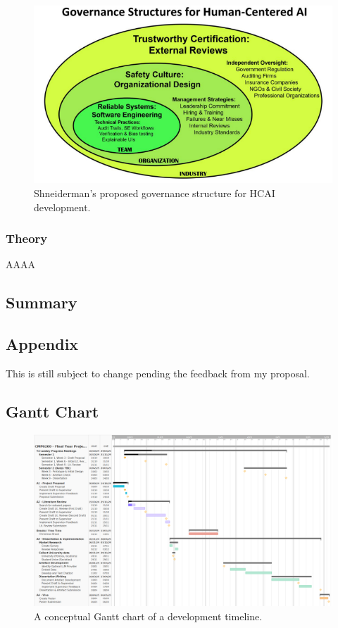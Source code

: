 \documentclass[12pt]{report}
\begin{document}
    
    \begin{figure}[H]
        \centering
        \includegraphics[width=.6\linewidth]{shneidermanStructure.png}
        \caption{Shneiderman's proposed governance structure for HCAI development.}
        \label{fig:govStructure}
    \end{figure}

    \subsection{Theory}

    AAAA
    
    \section{Summary}

    
    \begin{landscape}

    \chapter{Appendix}
    
    \begin{tcolorbox}[colback=red!5!white,colframe=red!75!black,title=Copied from proposal]
        This is still subject to change pending the feedback from my proposal.
    \end{tcolorbox}

    \section{Gantt Chart}



    \begin{figure}[H]
        \centering
        \includegraphics[width=.75\linewidth]{ProposalGantt.png}
        \caption{A conceptual Gantt chart of a development timeline.}
        \label{fig:gantt}
    \end{figure}

    \end{landscape}
\end{document}
